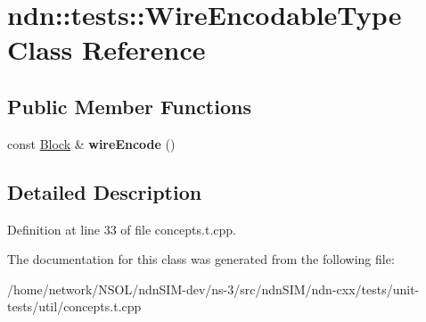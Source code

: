 \hypertarget{classndn_1_1tests_1_1WireEncodableType}{}\section{ndn\+:\+:tests\+:\+:Wire\+Encodable\+Type Class Reference}
\label{classndn_1_1tests_1_1WireEncodableType}
\subsection*{Public Member Functions}
\begin{DoxyCompactItemize}
\item 
const \hyperlink{classndn_1_1Block}{Block} \& {\bfseries wire\+Encode} ()\hypertarget{classndn_1_1tests_1_1WireEncodableType_aa83571b4c325e2d669d2fc61e0e2f861}{}\label{classndn_1_1tests_1_1WireEncodableType_aa83571b4c325e2d669d2fc61e0e2f861}

\end{DoxyCompactItemize}


\subsection{Detailed Description}


Definition at line 33 of file concepts.\+t.\+cpp.



The documentation for this class was generated from the following file\+:\begin{DoxyCompactItemize}
\item 
/home/network/\+N\+S\+O\+L/ndn\+S\+I\+M-\/dev/ns-\/3/src/ndn\+S\+I\+M/ndn-\/cxx/tests/unit-\/tests/util/concepts.\+t.\+cpp\end{DoxyCompactItemize}
